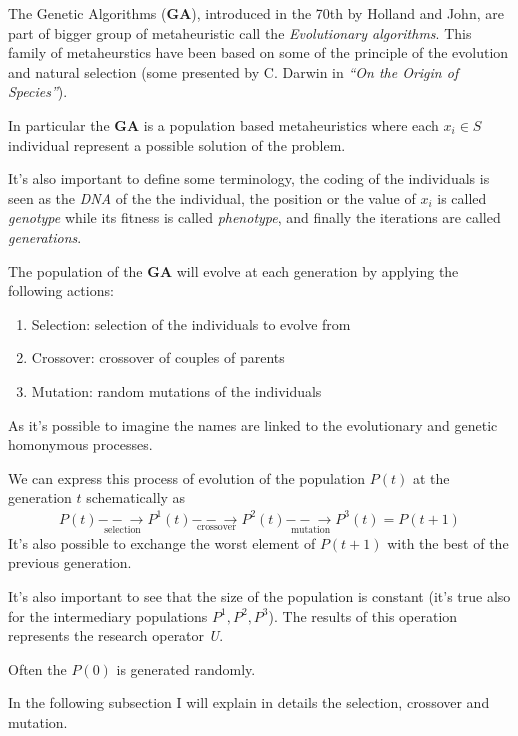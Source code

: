 \documentclass{article}
\newcommand{\longminus}{{-\!\!-}}
\newcommand{\tmem}[1]{{\em #1\/}}
\newcommand{\tmop}[1]{\ensuremath{\operatorname{#1}}}
\newcommand{\tmstrong}[1]{\textbf{#1}}
\begin{document}
The Genetic Algorithms ({\tmstrong{GA}}), introduced in the 70th by Holland
and John, are part of bigger group of metaheuristic call the
{\tmem{Evolutionary algorithms}}. This family of metaheurstics have been based
on some of the principle of the evolution and natural selection (some
presented by C. Darwin in {\tmem{``On the Origin of Species''}}).

In particular the {\tmstrong{GA}} is a population based metaheuristics where
each $x_i \in S$ individual represent a possible solution of the problem.

It's also important to define some terminology, the coding of the individuals
is seen as the {\tmem{DNA}} of the the individual, the position or the value
of $x_i$ is called {\tmem{genotype}} while its fitness is called
{\tmem{phenotype}}, and finally the iterations are called
{\tmem{generations}}.

The population of the {\tmstrong{GA}} will evolve at each generation by
applying the following actions:
\begin{enumerate}
  \item Selection: selection of the individuals to evolve from
  
  \item Crossover: crossover of couples of parents \
  
  \item Mutation: random mutations of the individuals
\end{enumerate}
As it's possible to imagine the names are linked to the evolutionary and
genetic homonymous processes. \

We can express this process of evolution of the population $P (t)$ at the
generation $t$ schematically as
\[ P (t) \overset{}{\underset{\tmop{selection}}{\longminus \rightarrow} P^1
   (t) \underset{\tmop{crossover}}{\longminus \rightarrow} P^2 (t)
   \underset{\tmop{mutation}}{\longminus \rightarrow}} P^3 (t) = P (t + 1) \]
It's also possible to exchange the worst element of $P (t + 1)$ with the best
of the previous generation.

It's also important to see that the size of the population is constant (it's
true also for the intermediary populations $P^1, P^2, P^3$). The results of
this operation represents the research operator {\tmem{U}}.

Often the $P (0)$ is generated randomly.

In the following subsection I will explain in details the selection,
crossover and mutation.
\end{document}

